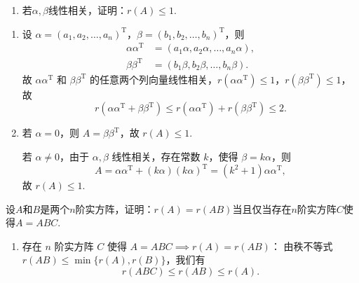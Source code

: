 \begin{exercise}
\begin{exgroup}
\begin{enumerate}
            \item 若$\alpha,\beta$线性相关，证明：$r(A) \leqslant 1$.
        \end{enumerate}
        \begin{answer}
            \begin{enumerate}
                \item 设 $\alpha = (a_1, a_2, \ldots, a_n)^\mathrm{T}$，$\beta = (b_1, b_2, \ldots, b_n)^\mathrm{T}$，则
                    \begin{align*}
                        \alpha \alpha^\mathrm{T} &= (a_1 \alpha, a_2 \alpha, \ldots, a_n \alpha), \\
                        \beta \beta^\mathrm{T} &= (b_1 \beta, b_2 \beta, \ldots, b_n \beta).
                    \end{align*}
                    故 $\alpha \alpha^\mathrm{T}$ 和 $\beta \beta^\mathrm{T}$ 的任意两个列向量线性相关，$r\left(\alpha \alpha^\mathrm{T}\right) \leqslant 1$，$r\left(\beta \beta^\mathrm{T}\right) \leqslant 1$，故
                    \[
                        r\left(\alpha \alpha^\mathrm{T} + \beta \beta^\mathrm{T}\right) \leqslant r\left(\alpha \alpha^\mathrm{T}\right) + r\left(\beta \beta^\mathrm{T}\right) \leqslant 2.
                    \]

                \item 若 $\alpha = 0$，则 $A = \beta \beta^\mathrm{T}$，故 $r(A) \leqslant 1$.

                    若 $\alpha \neq 0$，由于 $\alpha, \beta$ 线性相关，存在常数 $k$，使得 $\beta = k \alpha$，则
                    \[
                        A = \alpha \alpha^\mathrm{T} + (k \alpha)(k \alpha)^\mathrm{T} = (k^2 + 1) \alpha \alpha^\mathrm{T},
                    \]
                    故 $r(A) \leqslant 1$.
            \end{enumerate}
        \end{answer}

        \item 设$A$和$B$是两个$n$阶实方阵，证明：$r(A)=r(AB)$当且仅当存在$n$阶实方阵$C$使得$A=ABC$.
        \begin{answer}
            \begin{enumerate}
                \item 存在 $n$ 阶实方阵 $C$ 使得 $A = ABC \implies r(A) = r(AB)$：
                    由秩不等式 $r(AB) \leqslant \min\{r(A), r(B)\}$，我们有
                    \[
                        r(ABC) \leqslant r(AB) \leqslant r(A).
                    \]


\end{enumerate}
\end{answer}
\end{exgroup}
\end{exercise}
